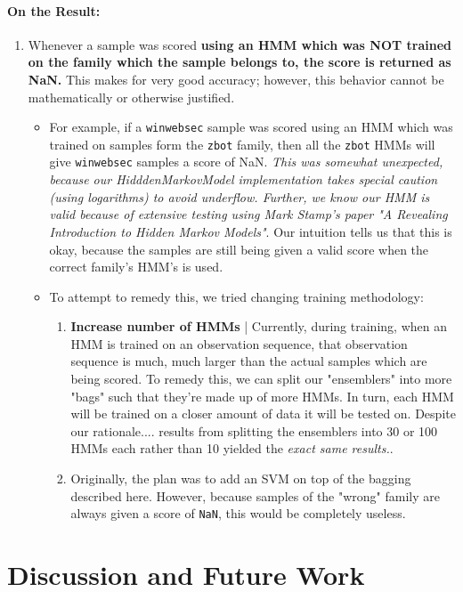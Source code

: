 \documentclass[12pt]{article}
\begin{document}
  \paragraph{On the Result:}
  \begin{enumerate}
    \item Whenever a sample was scored \textbf{using an HMM which was NOT trained on the family which the sample belongs to, the score is returned as NaN.} This makes for very good accuracy; however, this behavior cannot be mathematically or otherwise justified.
      \begin{itemize}
        \item For example, if a \texttt{winwebsec} sample was scored using an HMM which was trained on samples form the \texttt{zbot} family, then all the \texttt{zbot} HMMs will give \texttt{winwebsec} samples a score of NaN. \textit{This was somewhat unexpected, because our HidddenMarkovModel implementation takes special caution (using logarithms) to avoid underflow. Further, we know our HMM is valid because of extensive testing using Mark Stamp's paper "A Revealing Introduction to Hidden Markov Models"}. Our intuition tells us that this is okay, because the samples are still being given a valid score when the correct family's HMM's is used.
        \item To attempt to remedy this, we tried changing training methodology:
          \begin{enumerate}
            \item \textbf{Increase number of HMMs} | Currently, during training, when an HMM is trained on an observation sequence, that observation sequence is much, much larger than the actual samples which are being scored. To remedy this, we can split our "ensemblers" into more "bags" such that they're made up of more HMMs. In turn, each HMM will be trained on a closer amount of data it will be tested on. Despite our rationale.... results from splitting the ensemblers into 30 or 100 HMMs each rather than 10 yielded the \textit{exact same results.}.
        \item Originally, the plan was to add an SVM on top of the bagging described here. However, because samples of the "wrong" family are always given a score of \texttt{NaN}, this would be completely useless.
          \end{enumerate}
     \end{itemize}
  \end{enumerate}

\section{Discussion and Future Work}
\end{document}
